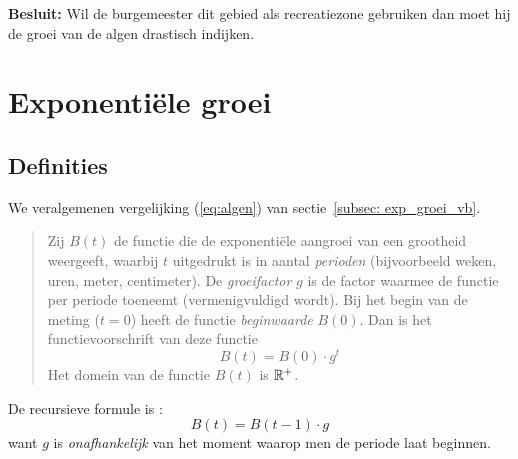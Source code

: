 \noindent
\textbf {Besluit:} Wil de burgemeester dit gebied als recreatiezone gebruiken
 dan moet hij de groei van de algen drastisch indijken.



\newpage
\section{Exponenti\"ele groei}
\subsection{Definities}

We veralgemenen vergelijking (\ref{eq:algen}) van sectie~\ref{subsec: exp_groei_vb}. 
\begin{quote}

Zij  $B(t)$ de functie die de exponenti\"{e}le
aangroei van een grootheid weergeeft, waarbij $t$ uitgedrukt is in aantal \emph{perioden} (bijvoorbeeld weken, uren, meter, centimeter). De \emph{groeifactor} $g$ is de factor waarmee de functie per periode toeneemt (vermenigvuldigd wordt). Bij het begin van de meting ($t=0$) heeft de functie \emph{beginwaarde} $B(0)$. Dan is het functievoorschrift van deze functie
\begin{equation}
    B(t)=B(0)\cdot g^{t}
    \label{eq:eq_groei2}
\end{equation}
Het domein van de functie $B(t)$ is $\mathbb{R}^+$.

\end{quote}
De recursieve formule is :
\begin{equation}
    B(t)=B(t-1)\cdot g
\end{equation}
want $g$ is \emph{onafhankelijk} van het moment waarop men de periode laat
beginnen.



